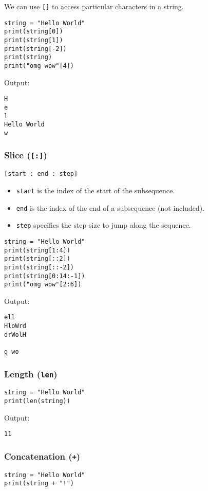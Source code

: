 \documentclass[11pt]{article}
\begin{document}
We can use \texttt{[]} to access particular characters in a string.
\begin{verbatim}
string = "Hello World"
print(string[0])
print(string[1])
print(string[-2])
print(string)
print("omg wow"[4])
\end{verbatim}

 \noindent Output:

\label{orgf9733c1}
\begin{verbatim}
H
e
l
Hello World
w
\end{verbatim}


 \newpage
\subsubsection{Slice (\texttt{[:]})}
\label{sec:orga1d5169}
\texttt{[start : end : step]}
\begin{itemize}
\item \texttt{start} is the index of the start of the subsequence.
\item \texttt{end} is the index of the end of a subsequence (not included).
\item \texttt{step} specifies the step size to jump along the sequence.
\end{itemize}

\begin{verbatim}
string = "Hello World"
print(string[1:4])
print(string[::2])
print(string[::-2])
print(string[0:14:-1])
print("omg wow"[2:6])
\end{verbatim}

 \noindent Output:

\label{org5120a97}
\begin{verbatim}
ell
HloWrd
drWolH

g wo
\end{verbatim}
\subsubsection{Length (\texttt{len})}
\label{sec:org2af6ece}
\begin{verbatim}
string = "Hello World"
print(len(string))
\end{verbatim}

 \noindent Output:

\label{orge01273b}
\begin{verbatim}
11
\end{verbatim}
\subsubsection{Concatenation (\texttt{+})}
\label{sec:org2ddc121}
\begin{verbatim}
string = "Hello World"
print(string + "!")
\end{verbatim}
\end{document}
